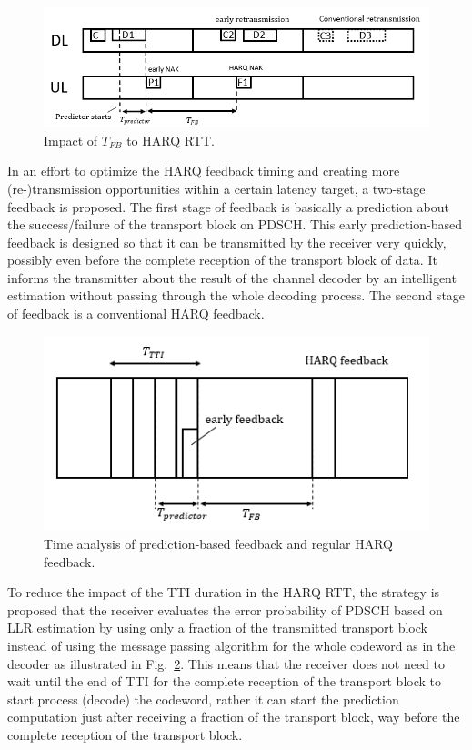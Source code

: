 \documentclass[conference]{IEEEtran}
\begin{document}
\begin{figure}[htbp]
\centerline{\includegraphics[scale=0.4]{fig1.png}}
\caption{Impact of $T_{FB}$ to HARQ RTT.}
\label{fig1}
\end{figure}

In an effort to optimize the HARQ feedback timing and creating more (re-)transmission opportunities within a certain latency target, a two-stage feedback is proposed. The first stage of feedback is basically a prediction about the success/failure of the transport block on PDSCH. This early prediction-based feedback is designed so that it can be transmitted by the receiver very quickly, possibly even before the complete reception of the transport block of data. It informs the transmitter about the result of the channel decoder by an intelligent estimation without passing through the whole decoding process. The second stage of feedback is a conventional HARQ feedback.

\begin{figure}[htbp]
\centerline{\includegraphics[scale=0.4]{fig2.png}}
\caption{Time analysis of prediction-based feedback and regular HARQ feedback.}
\label{fig2}
\end{figure}

To reduce the impact of the TTI duration in the HARQ RTT, the strategy is proposed that the receiver evaluates the error probability of PDSCH based on LLR estimation by using only a fraction of the transmitted transport block instead of using the message passing algorithm for the whole codeword as in the decoder as illustrated in Fig.~\ref{fig2}. This means that the receiver does not need to wait until the end of TTI for the complete reception of the transport block to start process (decode) the codeword, rather it can start the prediction computation just after receiving a fraction of the transport block, way before the complete reception of the transport block.
\end{document}
